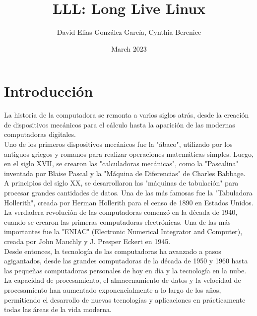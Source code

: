 \documentclass{article}
\title{LLL: Long Live Linux}
\author{David Elias González García, Cynthia Berenice }
\date{March 2023}
\begin{document}
\maketitle
\tableofcontents
\pagebreak
\section{Introducción}
La historia de la computadora se remonta a varios siglos atrás, desde la creación de dispositivos mecánicos para el cálculo hasta la aparición de las modernas computadoras digitales.\\

Uno de los primeros dispositivos mecánicos fue la "ábaco", utilizado por los antiguos griegos y romanos para realizar operaciones matemáticas simples. Luego, en el siglo XVII, se crearon las "calculadoras mecánicas", como la "Pascalina" inventada por Blaise Pascal y la "Máquina de Diferencias" de Charles Babbage.\\

A principios del siglo XX, se desarrollaron las "máquinas de tabulación" para procesar grandes cantidades de datos. Una de las más famosas fue la "Tabuladora Hollerith", creada por Herman Hollerith para el censo de 1890 en Estados Unidos.\\

La verdadera revolución de las computadoras comenzó en la década de 1940, cuando se crearon las primeras computadoras electrónicas. Una de las más importantes fue la "ENIAC" (Electronic Numerical Integrator and Computer), creada por John Mauchly y J. Presper Eckert en 1945.\\

Desde entonces, la tecnología de las computadoras ha avanzado a pasos agigantados, desde las grandes computadoras de la década de 1950 y 1960 hasta las pequeñas computadoras personales de hoy en día y la tecnología en la nube. La capacidad de procesamiento, el almacenamiento de datos y la velocidad de procesamiento han aumentado exponencialmente a lo largo de los años, permitiendo el desarrollo de nuevas tecnologías y aplicaciones en prácticamente todas las áreas de la vida moderna. \\
\end{document}
